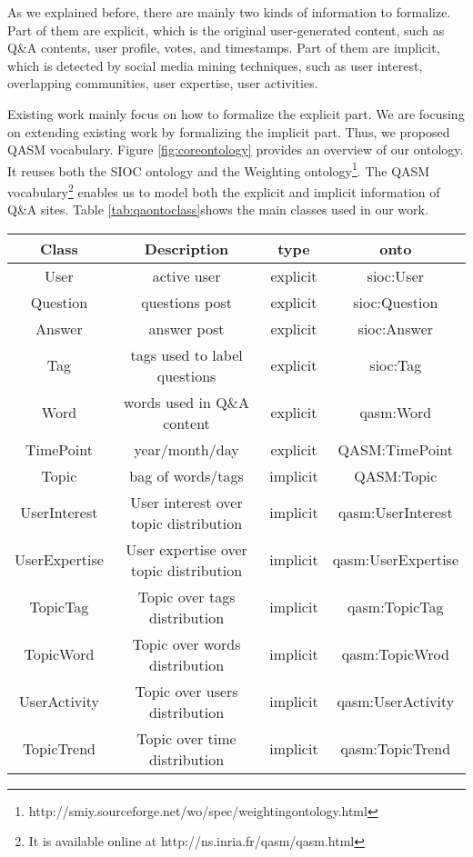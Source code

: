 As we explained before, there are mainly two kinds of information to formalize. Part of them are explicit, which is the original user-generated content, such as Q\&A contents, user profile, votes, and timestamps. Part of them are implicit, which is detected by social media mining techniques, such as user interest, overlapping communities, user expertise, user activities. 

Existing work mainly focus on how to formalize the explicit part. We are focusing on extending existing work by formalizing the implicit part. Thus, we proposed QASM vocabulary. Figure \ref{fig:coreontology} provides an overview of our ontology. It reuses both the SIOC ontology and the Weighting ontology\footnote{http://smiy.sourceforge.net/wo/spec/weightingontology.html}.
The QASM vocabulary\footnote{It is available online at http://ns.inria.fr/qasm/qasm.html} enables us to model both the explicit and implicit information of Q\&A sites. Table \ref{tab:qaontoclass}shows the main classes used in our work.


\begin{sidewaystable}
    \centering
    \begin{tabular}{c|c|c|c}
    \hline
    Class &  Description & type & onto \\ \hline
    User  & active user & explicit &  sioc:User \\ \hline
    Question & questions post & explicit & sioc:Question \\ \hline
    Answer  & answer post & explicit & sioc:Answer \\ \hline
    Tag & tags used to label questions & explicit & sioc:Tag \\ \hline
    Word & words used in Q\&A content & explicit & qasm:Word \\ \hline
    TimePoint & year/month/day & explicit & QASM:TimePoint \\ \hline
    Topic & bag of words/tags & implicit & QASM:Topic \\ \hline   
    UserInterest& User interest over topic distribution & implicit& qasm:UserInterest\\ \hline
    UserExpertise & User expertise over topic distribution &implicit& qasm:UserExpertise \\ \hline
    TopicTag &Topic over tags distribution&implicit &qasm:TopicTag \\ \hline
    
    TopicWord&Topic over words distribution &implicit & qasm:TopicWrod\\ \hline
    
    UserActivity&Topic over users distribution & implicit &qasm:UserActivity \\ \hline
    
    TopicTrend &Topic over time distribution &implicit & qasm:TopicTrend\\ \hline
          
    \end{tabular}
    \caption{the Vocabulary (class) used in our work}
    \label{tab:qaontoclass}
\end{sidewaystable}


